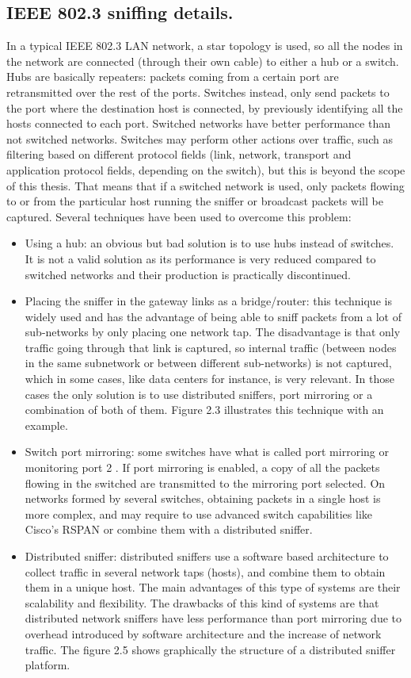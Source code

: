 \documentclass[thesis=M,english]{FITthesis}[2011/07/15]
\begin{document}
\subsection{IEEE 802.3 sniffing details.}
In a typical IEEE 802.3 LAN network, a star topology is used, so all the nodes in the network are connected (through their own cable) to either a hub or a switch. 
Hubs are basically repeaters: packets coming from a certain port are retransmitted over the rest of the ports.
Switches instead, only send packets to the port where the destination host is connected, by previously identifying all the hosts connected to each port. Switched networks have better performance than not switched networks. Switches may perform other actions over traffic, such as filtering based on different protocol fields (link, network, transport and application protocol fields, depending on the switch), but this is beyond the scope of this thesis.
That means that if a switched network is used, only packets flowing to or from the particular host running the sniffer or broadcast packets will be captured. Several techniques have been used to overcome this problem:
\begin{itemize}
\item Using a hub: an obvious but bad solution is to use hubs instead of switches. It is not a valid solution as its performance is very reduced compared to switched networks and their production is practically discontinued.
\item Placing the sniffer in the gateway links as a bridge/router: this technique is widely used and has the advantage of being able to sniff packets from a lot of sub-networks by only placing one network tap. The disadvantage is that only traffic going through that link is captured, so internal traffic (between nodes in the same subnetwork or between different sub-networks) is not captured, which in some cases, like data centers for instance, is very relevant. In those cases the only solution is to use distributed sniffers, port mirroring or a combination of both of them. Figure 2.3 illustrates this technique with an example.
\item Switch port mirroring: some switches have what is called port mirroring or monitoring port 2 . If port mirroring is enabled, a copy of all the packets flowing in the switched are transmitted to the mirroring port selected. On networks formed by several switches, obtaining packets in a single host is more complex, and may require to use advanced switch capabilities like Cisco’s RSPAN or combine them with a distributed sniffer.
\item Distributed sniffer: distributed sniffers use a software based architecture to collect traffic in several network taps (hosts), and combine them to obtain them in a unique host. The main advantages of this type of systems are their scalability and flexibility. The drawbacks of this kind of systems are that distributed network sniffers have less performance than port mirroring due to overhead introduced by software architecture and the increase of network traffic. The figure 2.5 shows graphically the structure of a distributed sniffer platform.
\end{itemize}
\end{document}
